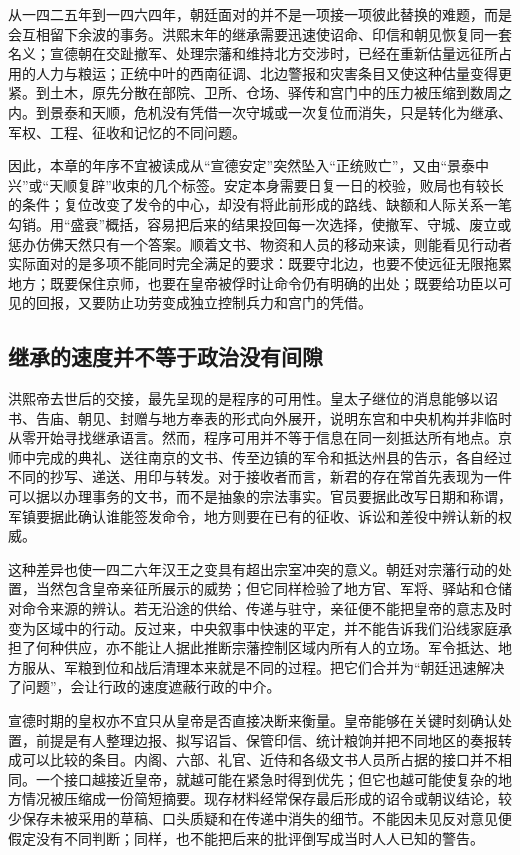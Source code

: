 从一四二五年到一四六四年，朝廷面对的并不是一项接一项彼此替换的难题，而是会互相留下余波的事务。洪熙末年的继承需要迅速使诏命、印信和朝见恢复同一套名义；宣德朝在交趾撤军、处理宗藩和维持北方交涉时，已经在重新估量远征所占用的人力与粮运；正统中叶的西南征调、北边警报和灾害条目又使这种估量变得更紧。到土木，原先分散在部院、卫所、仓场、驿传和宫门中的压力被压缩到数周之内。到景泰和天顺，危机没有凭借一次守城或一次复位而消失，只是转化为继承、军权、工程、征收和记忆的不同问题。

因此，本章的年序不宜被读成从“宣德安定”突然坠入“正统败亡”，又由“景泰中兴”或“天顺复辟”收束的几个标签。安定本身需要日复一日的校验，败局也有较长的条件；复位改变了发令的中心，却没有将此前形成的路线、缺额和人际关系一笔勾销。用“盛衰”概括，容易把后来的结果投回每一次选择，使撤军、守城、废立或惩办仿佛天然只有一个答案。顺着文书、物资和人员的移动来读，则能看见行动者实际面对的是多项不能同时完全满足的要求：既要守北边，也要不使远征无限拖累地方；既要保住京师，也要在皇帝被俘时让命令仍有明确的出处；既要给功臣以可见的回报，又要防止功劳变成独立控制兵力和宫门的凭借。

\subsection{继承的速度并不等于政治没有间隙}

洪熙帝去世后的交接，最先呈现的是程序的可用性。皇太子继位的消息能够以诏书、告庙、朝见、封赠与地方奉表的形式向外展开，说明东宫和中央机构并非临时从零开始寻找继承语言。然而，程序可用并不等于信息在同一刻抵达所有地点。京师中完成的典礼、送往南京的文书、传至边镇的军令和抵达州县的告示，各自经过不同的抄写、递送、用印与转发。对于接收者而言，新君的存在常首先表现为一件可以据以办理事务的文书，而不是抽象的宗法事实。官员要据此改写日期和称谓，军镇要据此确认谁能签发命令，地方则要在已有的征收、诉讼和差役中辨认新的权威。

这种差异也使一四二六年汉王之变具有超出宗室冲突的意义。朝廷对宗藩行动的处置，当然包含皇帝亲征所展示的威势；但它同样检验了地方官、军将、驿站和仓储对命令来源的辨认。若无沿途的供给、传递与驻守，亲征便不能把皇帝的意志及时变为区域中的行动。反过来，中央叙事中快速的平定，并不能告诉我们沿线家庭承担了何种供应，亦不能让人据此推断宗藩控制区域内所有人的立场。军令抵达、地方服从、军粮到位和战后清理本来就是不同的过程。把它们合并为“朝廷迅速解决了问题”，会让行政的速度遮蔽行政的中介。

宣德时期的皇权亦不宜只从皇帝是否直接决断来衡量。皇帝能够在关键时刻确认处置，前提是有人整理边报、拟写诏旨、保管印信、统计粮饷并把不同地区的奏报转成可以比较的条目。内阁、六部、礼官、近侍和各级文书人员所占据的接口并不相同。一个接口越接近皇帝，就越可能在紧急时得到优先；但它也越可能使复杂的地方情况被压缩成一份简短摘要。现存材料经常保存最后形成的诏令或朝议结论，较少保存未被采用的草稿、口头质疑和在传递中消失的细节。不能因未见反对意见便假定没有不同判断；同样，也不能把后来的批评倒写成当时人人已知的警告。

